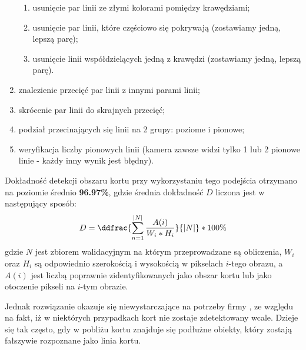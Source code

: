 \begin{enumerate}
\begin{enumerate}
          \item usunięcie par linii ze złymi kolorami pomiędzy krawędziami;
          \item usunięcie par linii, które częściowo się pokrywają (zostawiamy jedną, lepszą parę);
          \item usunięcie linii współdzielących jedną z krawędzi (zostawiamy jedną, lepszą parę).
        \end{enumerate}
  \item znalezienie przecięć par linii z innymi parami linii;
  \item skrócenie par linii do skrajnych przecięć;
  \item podział przecinających się linii na 2 grupy: poziome i pionowe;
  \item weryfikacja liczby pionowych linii (kamera zawsze widzi tylko 1 lub 2 pionowe linie - każdy inny wynik jest błędny).
\end{enumerate}

Dokładność detekcji obszaru kortu przy wykorzystaniu tego podejścia otrzymano na poziomie średnio \textbf{96.97\%}, gdzie średnia dokładność $D$ liczona jest w następujący sposób:
\vspace{-3pt} 
\[
\vspace{-3pt}
D = \ddfrac{\sum_{n = 1}^{|N|} \frac{A(i)}{W_{i} * H_{i}}}{|N|} * 100\%
\vspace{-3pt}
\]
gdzie $N$ jest zbiorem walidacyjnym na którym przeprowadzane są obliczenia, $W_{i}$ oraz $H_{i}$ są odpowiednio szerokością i wysokością w pikselach $i$-tego obrazu, a $A(i)$ jest liczbą poprawnie zidentyfikowanych jako obszar kortu lub jako otoczenie pikseli na $i$-tym obrazie.

Jednak rozwiązanie okazuje się niewystarczające na potrzeby firmy \blue{}, ze względu na fakt, iż w niektórych przypadkach kort nie zostaje zdetektowany wcale. Dzieje się tak często, gdy w pobliżu kortu znajduje się podłużne obiekty, który zostają fałszywie rozpoznane jako linia kortu.

